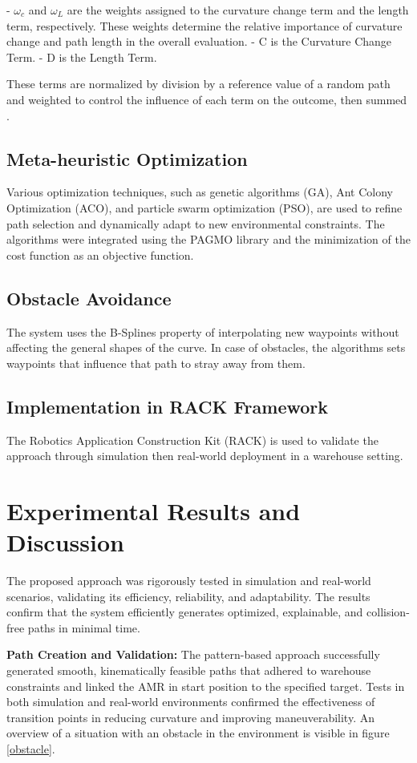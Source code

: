 \documentclass{amam}                %
\begin{document}
\noindent - \(\omega_c\) and \(\omega_L\) are the weights assigned to the curvature change term and the length term, 
    respectively. These weights determine the relative importance of curvature change and path length in the overall evaluation. 
\newline - C is the Curvature Change Term.
\newline - D is the Length Term.

These terms are normalized by division by a reference value of a random path and weighted to control the influence of each term on the outcome, then summed \cite{ref3}.

\subsection{Meta-heuristic Optimization}
Various optimization techniques, such as genetic algorithms (GA), Ant Colony Optimization (ACO), and particle swarm optimization (PSO), are used to refine path selection and dynamically adapt to new environmental constraints. The algorithms were integrated using the PAGMO library and the minimization of the cost function as an objective function.
\subsection{Obstacle Avoidance}
The system uses the B-Splines property of interpolating new waypoints without affecting the general shapes of the curve. In case of obstacles, the algorithms sets waypoints that influence that path to stray away from them. 
\subsection{Implementation in RACK Framework}
The Robotics Application Construction Kit (RACK) is used to validate the approach through simulation then real-world deployment in a warehouse setting.


\section{Experimental Results and Discussion}
The proposed approach was rigorously tested in simulation and real-world scenarios, validating its efficiency, reliability, and adaptability. The results confirm that the system efficiently generates optimized, explainable, and collision-free paths in minimal time.

\noindent \textbf{Path Creation and Validation:} The pattern-based approach successfully generated smooth, kinematically feasible paths that adhered to warehouse constraints and linked the AMR in start position to the specified target. Tests in both simulation and real-world environments confirmed the effectiveness of transition points in reducing curvature and improving maneuverability. An overview of a situation with an obstacle in the environment is visible in figure \ref{obstacle}. 
\end{document}
